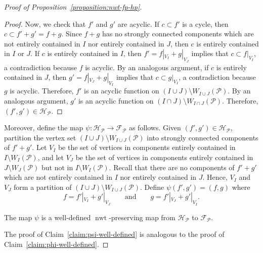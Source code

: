 \documentclass[11pt]{article}
\theoremstyle{definition}
\numberwithin{equation}{section}
\DeclareMathOperator{\normalizedweight}{nwt}
\begin{document}
\begin{proof}[Proof of Proposition~\ref{proposition:nwt-fp-hp}]
\begin{proof}
Now, we check that \(f'\) and \(g'\) are acyclic.
If \(c \subset f'\) is a cycle, then \(c \subset f' + g' = f + g\).
Since \(f+g\) has no strongly connected components which are not entirely contained in \(I\) nor entirely contained in \(J\), then \(c\) is entirely contained in \(I\) or \(J\).
If \(c\) is entirely contained in \(I\), then \(f' = f|_{V_I} + g|_{V_J}\) implies that \(c \subset f|_{V_I}\), a contradiction because \(f\) is acyclic.
By an analogous argument, if \(c\) is entirely contained in \(J\), then \(g' = f|_{V_J} + g|_{V_I}\) implies that \(c \subset g|_{V_I}\), a contradiction because \(g\) is acyclic.
Therefore, \(f'\) is an acyclic function on \((I \cup J) \setminus W_{I \cup J}(\mathcal{P})\).
By an analogous argument, \(g'\) is an acyclic function on \((I \cap J) \setminus W_{I \cap J}(\mathcal{P})\).
Therefore, \((f', g') \in \mathcal{H}_{\mathcal{P}}\).
\end{proof}

Moreover, define the map \(\psi \colon \mathcal{H}_{\mathcal{P}} \to \mathcal{F}_{\mathcal{P}}\) as follows.
Given \((f', g') \in \mathcal{H}_{\mathcal{P}}\),
partition the vertex set \((I \cup J) \setminus W_{I \cup J}(\mathcal{P})\) into strongly connected components of \(f'+g'\).
Let \(V_I\) be the set of vertices in components entirely contained in \(I \setminus W_I(\mathcal{P})\),
and let \(V_J\) be the set of vertices in components entirely contained in \(J \setminus W_J(\mathcal{P})\) but not in \(I \setminus W_I(\mathcal{P})\).
Recall that there are no components of \(f'+g'\) which are not entirely contained in \(I\) nor entirely contained in \(J\).
Hence, \(V_I\) and \(V_J\) form a partition of \((I \cup J) \setminus W_{I \cup J}(\mathcal{P})\).
Define \(\psi(f', g') = (f, g)\) where
\begin{equation*}
    f = f'|_{V_I} + g'|_{V_J} \qquad \text{and} \qquad g = f'|_{V_J} + g'|_{V_I}.
\end{equation*}

\begin{claim} \label{claim:psi-well-defined}
    The map \(\psi\) is a well-defined \(\normalizedweight\)-preserving map from \(\mathcal{H}_{\mathcal{P}}\) to \(\mathcal{F}_{\mathcal{P}}\).
\end{claim}

The proof of Claim~\ref{claim:psi-well-defined} is analogous to the proof of Claim~\ref{claim:phi-well-defined}.


\end{proof}
\end{document}
